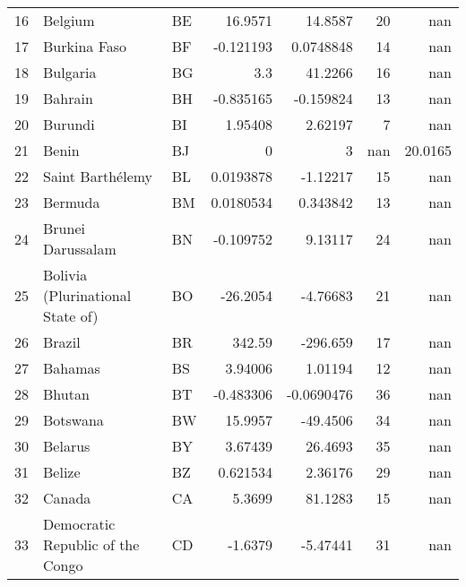 \begin{tabular}{rllrrrr}
 16 & Belgium                          & BE         &   16.9571     &    14.8587    &     20 &     nan      \\
 17 & Burkina Faso                     & BF         &   -0.121193   &     0.0748848 &     14 &     nan      \\
 18 & Bulgaria                         & BG         &    3.3        &    41.2266    &     16 &     nan      \\
 19 & Bahrain                          & BH         &   -0.835165   &    -0.159824  &     13 &     nan      \\
 20 & Burundi                          & BI         &    1.95408    &     2.62197   &      7 &     nan      \\
 21 & Benin                            & BJ         &    0          &     3         &    nan &      20.0165 \\
 22 & Saint Barthélemy                 & BL         &    0.0193878  &    -1.12217   &     15 &     nan      \\
 23 & Bermuda                          & BM         &    0.0180534  &     0.343842  &     13 &     nan      \\
 24 & Brunei Darussalam                & BN         &   -0.109752   &     9.13117   &     24 &     nan      \\
 25 & Bolivia (Plurinational State of) & BO         &  -26.2054     &    -4.76683   &     21 &     nan      \\
 26 & Brazil                           & BR         &  342.59       &  -296.659     &     17 &     nan      \\
 27 & Bahamas                          & BS         &    3.94006    &     1.01194   &     12 &     nan      \\
 28 & Bhutan                           & BT         &   -0.483306   &    -0.0690476 &     36 &     nan      \\
 29 & Botswana                         & BW         &   15.9957     &   -49.4506    &     34 &     nan      \\
 30 & Belarus                          & BY         &    3.67439    &    26.4693    &     35 &     nan      \\
 31 & Belize                           & BZ         &    0.621534   &     2.36176   &     29 &     nan      \\
 32 & Canada                           & CA         &    5.3699     &    81.1283    &     15 &     nan      \\
 33 & Democratic Republic of the Congo & CD         &   -1.6379     &    -5.47441   &     31 &     nan      \\

\end{tabular}
